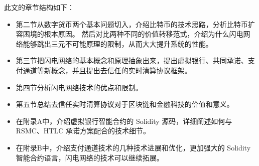 此文的章节结构如下：

\begin{itemize}
    \item 第二节从数字货币两个基本问题切入，介绍比特币的技术思路，分析比特币扩容困境的根本原因。
          然后对比两种不同的价值转移范式，介绍为什么闪电网络能够跳出三元不可能原理的限制，从而大大提升系统的性能。
    \item 第三节把闪电网络的基本概念和原理抽象出来，提出虚拟银行、共同承诺、支付通道等新概念，并且提出去信任的实时清算协议框架。
    \item 第四节分析闪电网络技术的优点和限制。
    \item 第五节总结去信任实时清算协议对于区块链和金融科技的价值和意义。
    \item 在附录A中，介绍虚拟银行智能合约的 Solidity 源码，详细阐述如何与 RSMC、HTLC 承诺方案配合的技术细节。
    \item 在附录B中，介绍支付通道技术的几种技术进展和优化，更加强大的 Solidity 智能合约语言，闪电网络的技术可以继续拓展。
\end{itemize}
